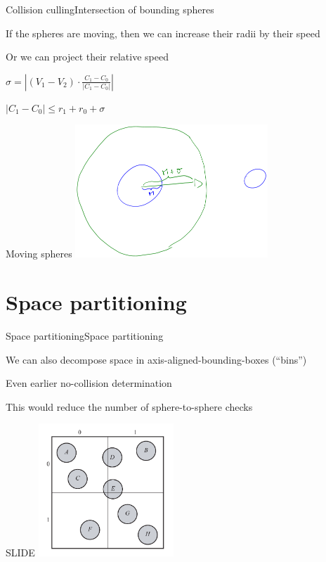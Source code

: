 \documentclass{beamer}
\begin{document}
\begin{slide}{Collision culling}{Intersection of bounding spheres}{
\item If the spheres are moving, then we can increase their radii by their speed
\item Or we can project their relative speed
\pause
\item $\sigma = |(V_1 - V_2) \cdot \frac{C_1 - C_0}{|C_1 - C_0|}|$
\item $|C_1 - C_0| \leq r_1 + r_0 + \sigma$
}\end{slide}

\begin{frame}{Moving spheres}
\center
\includegraphics[height=5cm]{Pics/MovingSpheres.png}
\end{frame}

\section{Space partitioning}
\begin{slide}{Space partitioning}{Space partitioning}{
\item We can also decompose space in axis-aligned-bounding-boxes (``bins'')
\item Even earlier no-collision determination
\item This would reduce the number of sphere-to-sphere checks
}\end{slide}

\begin{frame}{SLIDE}
\center
\includegraphics[height=5cm]{Pics/SpacePartitioning.png}
\end{frame}
\end{document}
